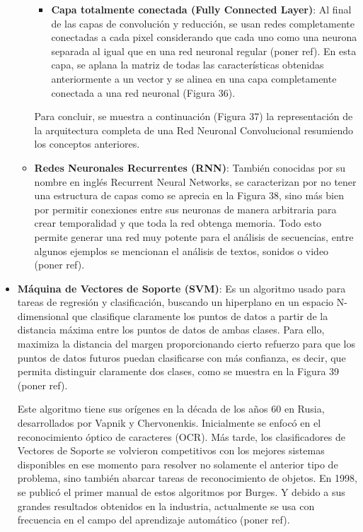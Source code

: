 \begin{itemize}
\begin{itemize}
\begin{itemize}
			\item \textbf{Capa totalmente conectada (Fully Connected Layer)}: Al final de las capas de convolución y reducción, se usan redes completamente conectadas a cada pixel considerando que cada uno como una neurona separada al igual que en una red neuronal regular (poner ref). En esta capa, se aplana la matriz de todas las características obtenidas anteriormente a un vector y se alinea en una capa completamente conectada a una red neuronal (Figura 36).
		\end{itemize}
		Para concluir, se muestra a continuación (Figura 37) la representación de la arquitectura completa de una Red Neuronal Convolucional resumiendo los conceptos anteriores.
		
		\item \textbf{Redes Neuronales Recurrentes (RNN)}: También conocidas por su nombre en inglés Recurrent Neural Networks, se caracterizan por no tener una estructura de capas como se aprecia en la Figura 38, sino más bien por permitir conexiones entre sus neuronas de manera arbitraria para crear temporalidad y que toda la red obtenga memoria. Todo esto permite generar una red muy potente para el análisis de secuencias, entre algunos ejemplos se mencionan el análisis de textos, sonidos o video (poner ref).
	\end{itemize}
	\item \textbf{Máquina de Vectores de Soporte (SVM)}: Es un algoritmo usado para tareas de regresión y clasificación, buscando un hiperplano en un espacio N-dimensional que clasifique claramente los puntos de datos a partir de la distancia máxima entre los puntos de datos de ambas clases. Para ello, maximiza la distancia del margen proporcionando cierto refuerzo para que los puntos de datos futuros puedan clasificarse con más confianza, es decir, que permita distinguir claramente dos clases, como se muestra en la Figura 39 (poner ref).
	
	Este algoritmo tiene sus orígenes en la década de los años 60 en Rusia, desarrollados por Vapnik y Chervonenkis. Inicialmente se enfocó en el reconocimiento óptico de caracteres (OCR). Más tarde, los clasificadores de Vectores de Soporte se volvieron competitivos con los mejores sistemas disponibles en ese momento para resolver no solamente el anterior tipo de problema, sino también abarcar tareas de reconocimiento de objetos. En 1998, se publicó el primer manual de estos algoritmos por Burges. Y debido a sus grandes resultados obtenidos en la industria, actualmente se usa con frecuencia en el campo del aprendizaje automático (poner ref).
	

\end{itemize}
